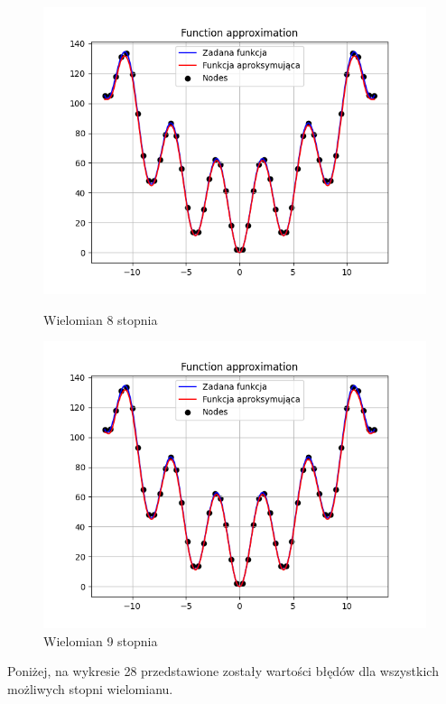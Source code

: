\documentclass{article}
\begin{document}
\begin{figure}[H]
\begin{minipage}[b]{0.49\textwidth}
    \begin{minipage}[b]{\textwidth}
      \includegraphics[width=\textwidth]{img26.png}
      \caption{Wielomian 8 stopnia}
    \end{minipage}
    \vspace*{\fill}
    \begin{minipage}[b]{\textwidth}
      \includegraphics[width=\textwidth]{img27.png}
      \caption{Wielomian 9 stopnia}
    \end{minipage}
  \end{minipage}
\end{figure}

\noindent
Poniżej, na wykresie 28 przedstawione zostały wartości błędów dla wszystkich możliwych stopni wielomianu.
\end{document}
